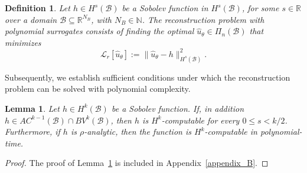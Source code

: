 \documentclass[pdflatex]{sn-jnl}%
\newtheorem{lemma}[theorem]{Lemma}
\newtheorem{definition}[theorem]{Definition}
\begin{document}
\begin{definition}\label{Def:rec_prob}
    Let $h \in H^s(\mathcal{B})$ be a Sobolev function in $H^s(\mathcal{B})$, for some $s\in \mathbb{R}$ over a domain $\mathcal{B} \subseteq \mathbb{R}^{N_B}$, with $N_B \in \mathbb{N}$.  
    The \emph{reconstruction problem} with polynomial surrogates consists of finding the optimal $\hat{u}_\theta \in \Pi_{n}(\mathcal{B})$ that minimizes  
    \begin{equation}
        \mathcal{L}_r[\hat{u}_\theta] := \| \hat{u}_\theta - h \|_{H^s(\mathcal{B})}^2 .
    \end{equation}
\end{definition}
Subsequently, we establish sufficient conditions under which the reconstruction problem can be solved with polynomial complexity.
\begin{lemma}\label{lemm:comp_initial_data}
    Let $h\in H^k(\mathcal{B})$ be a Sobolev function. If, in addition $h\in AC^{k-1}(\mathcal{B})\cap BV^{k}(\mathcal{B})$, then $h$ is $H^k$-computable for every $0\leq s< k/2$. Furthermore, if $h$ is $\rho$-analytic, then the function is $H^k$-computable in polynomial-time.
\end{lemma}
\vspace{-1em}\begin{proof}
    The proof of Lemma~\ref{lemm:comp_initial_data} is included in Appendix~\ref{appendix_B}.
\end{proof}
\end{document}
